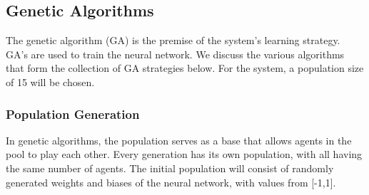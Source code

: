 \documentclass[12pt,a4paper]{article}
\begin{document}
\begin{figure}[ht!]
        \end{figure}
    

    \subsection{Genetic Algorithms}
        The genetic algorithm (GA) is the premise of the system's learning strategy. GA's are used to train the neural network. We discuss the various algorithms that form the collection of GA strategies below. For the system, a population size of 15 will be chosen.

        \subsubsection{Population Generation} \label{population_generation}
            In genetic algorithms, the population serves as a base that allows agents in the pool to play each other. Every generation has its own population, with all having the same number of agents. The initial population will consist of randomly generated weights and biases of the neural network, with values from [-1,1]. 
            
\end{document}
